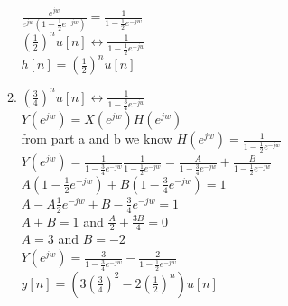 \documentclass[10pt,a4paper, margin=1in]{article}
\begin{document}
\begin{enumerate}
\begin{enumerate}
              $\frac{e^{jw}}{e^{jw}(1 - \frac{1}{2} e^{-jw})} = \frac{1}{1 - \frac{1}{2}e^{-jw}}$ \\

              $(\frac{1}{2})^n u[n] \leftrightarrow \frac{1}{1 - \frac{1}{2}e^{-jw}}$ \\

              $h[n] = (\frac{1}{2})^n u[n]$

              \item %
              
              $(\frac{3}{4})^nu[n] \leftrightarrow \frac{1}{1-\frac{3}{4}e^{-jw}}$ \\

              $Y(e^{jw}) = X(e^{jw}) H(e^{jw})$ \\

              from part a and b we know $H(e^{jw}) = \frac{1}{1-\frac{1}{2}e^{-jw}}$ \\

              $Y(e^{jw}) = \frac{1}{1-\frac{3}{4}e^{-jw}} \frac{1}{1-\frac{1}{2}e^{-jw}} = \frac{A}{1-\frac{3}{4}e^{-jw}} + \frac{B}{1-\frac{1}{2}e^{-jw}}$\\

              $A (1-\frac{1}{2}e^{-jw}) + B(1-\frac{3}{4}e^{-jw}) = 1$\\

              $A - A\frac{1}{2}e^{-jw} + B - \frac{3}{4}e^{-jw} = 1$\\

              $A+B = 1 $ and $\frac{A}{2} + \frac{3B}{4} = 0$ \\

              $A = 3$ and $B = -2$\\

              $Y(e^{jw}) = \frac{3}{1 - \frac{3}{4}e^{-jw}} - \frac{2}{1 - \frac{1}{2}e^{-jw}}$ \\

              $y[n] = (3(\frac{3}{4})^2 - 2(\frac{1}{2})^n)u[n]$


          \end{enumerate}


\end{enumerate}
\end{document}
